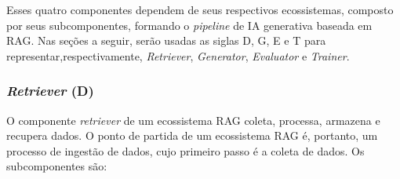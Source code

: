 \documentclass[a4paper, 12pt]{article}
\begin{document}
    Esses quatro componentes dependem de seus respectivos ecossistemas, composto por seus subcomponentes, formando o \textit{pipeline} de IA generativa baseada em RAG. Nas seções a seguir, serão usadas as siglas D, G, E e T para representar,respectivamente, \textit{Retriever}, \textit{Generator}, \textit{Evaluator} e \textit{Trainer}.

    \subsubsection{\textit{Retriever} (D)}

    O componente \textit{retriever} de um ecossistema RAG coleta, processa, armazena e recupera dados. O ponto de partida de um ecossistema RAG é, portanto, um processo de ingestão de dados, cujo primeiro passo é a coleta de dados. Os subcomponentes são:
\end{document}
